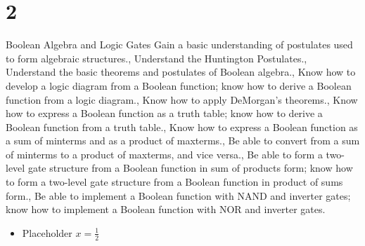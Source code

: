 \documentclass[mode=chapternotes, palette=purple, fontsize=12pt, font=default, official=false]{modernclassnotes}
\begin{document}


\newpage
\chapter{2}{Boolean Algebra and Logic Gates}{%
  Gain a basic understanding of postulates used to form algebraic structures.,%
  Understand the Huntington Postulates.,%
  Understand the basic theorems and postulates of Boolean algebra.,%
  Know how to develop a logic diagram from a Boolean function; know how to derive a Boolean function from a logic diagram.,%
  Know how to apply DeMorgan's theorems.,%
  Know how to express a Boolean function as a truth table; know how to derive a Boolean function from a truth table.,%
  Know how to express a Boolean function as a sum of minterms and as a product of maxterms.,%
  {Be able to convert from a sum of minterms to a product of maxterms, and vice versa.},%
  Be able to form a two-level gate structure from a Boolean function in sum of products form; know how to form a two-level gate structure from a Boolean function in product of sums form.,%
  Be able to implement a Boolean function with NAND and inverter gates; know how to implement a Boolean function with NOR and inverter gates.%
}
\begin{itemize}
\item Placeholder \( x = \frac{1}{2}\)
\end{itemize}
\end{document}

